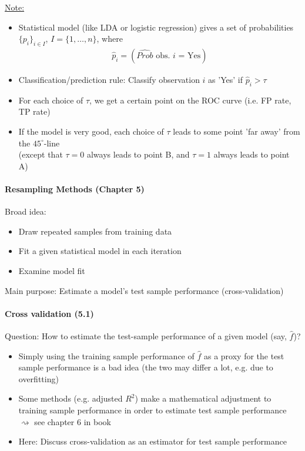 \documentclass[11pt,a4paper,numbers=endperiod]{scrartcl}
\begin{document}
{\underline{Note:} \begin{itemize}
	\item Statistical model (like LDA or logistic regression) gives a set of probabilities $\{p_i\}_{i \in I}$, $I = \{1, \ldots, n\}$, where \begin{align*}
		\hat{p}_i = (\text{$\widehat{Prob}$ obs. $i$ = Yes})
	\end{align*}
	\item Classification/prediction rule: Classify observation $i$ as 'Yes' if $\hat{p}_i > \tau$
	\item For each choice of $\tau$, we get a certain point on the ROC curve (i.e. FP rate, TP rate)
	\item If the model is very good, each choice of $\tau$ leads to some point 'far away' from the $45^{\circ}$-line\\
	(except that $\tau = 0$ always leads to point B, and $\tau = 1$ always leads to point A)
\end{itemize}

\paragraph{Resampling Methods (Chapter 5)}
$ $\\

Broad idea: \begin{itemize}
	\item Draw repeated samples from training data
	\item Fit a given statistical model in each iteration
	\item Examine model fit
\end{itemize}

Main purpose: Estimate a model's test sample performance (cross-validation)\\

\paragraph{Cross validation (5.1)}
$ $\\

Question: How to estimate the test-sample performance of a given model (say, $\hat{f}$)?
\begin{itemize}
	\item Simply using the training sample performance of $\hat{f}$ as a proxy for the test sample performance is a bad idea (the two may differ a lot, e.g. due to overfitting)
	\item Some methods (e.g. adjusted $R^2$) make a mathematical adjustment to training sample performance in order to estimate test sample performance $\rightsquigarrow$ see chapter 6 in book 
	\item Here: Discuss cross-validation as an estimator for test sample performance
\end{itemize}

}
\end{document}
